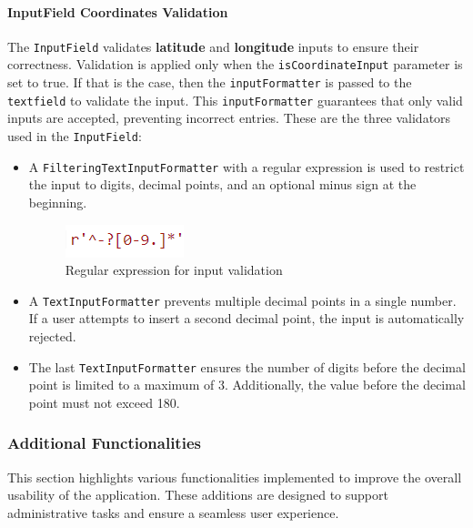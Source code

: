 \paragraph{InputField Coordinates Validation}
\label{fig:InputField Coordinates Validation}
    The \texttt{InputField} validates \textbf{latitude} and \textbf{longitude} inputs to ensure their correctness. Validation is applied only when the \texttt{isCoordinateInput} parameter is set to true. If that is the case, then the \texttt{inputFormatter} is passed to the \texttt{textfield} to validate the input. This \texttt{inputFormatter} guarantees that only valid inputs are accepted, preventing incorrect entries. These are the three validators used in the \texttt{InputField}:



    \begin{itemize}

        \item A \texttt{FilteringTextInputFormatter} with a regular expression is used to restrict the input to digits, decimal points, and an optional minus sign at the beginning.
        
        \begin{figure}[H]
            \centering
            \includegraphics[width=0.2\linewidth]{images/AdminPanel/regexInputFormatter.png}
            \caption{Regular expression for input validation}
        \end{figure}
                
        \item A \texttt{TextInputFormatter} prevents multiple decimal points in a single number. If a user attempts to insert a second decimal point, the input is automatically rejected.
        
        \item The last \texttt{TextInputFormatter} ensures the number of digits before the decimal point is limited to a maximum of 3. Additionally, the value before the decimal point must not exceed 180.
    \end{itemize}
\newpage


\subsubsection{Additional Functionalities}
    This section highlights various functionalities implemented to improve the overall usability of the application. These additions are designed to support administrative tasks and ensure a seamless user experience.

